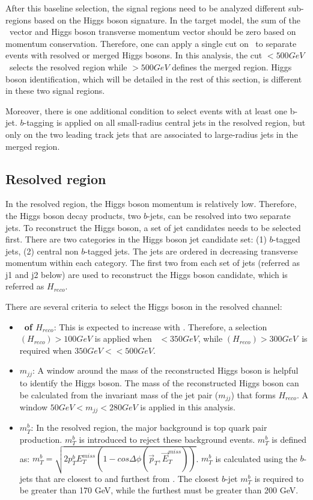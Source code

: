 \par After this baseline selection, the signal regions need to be analyzed different sub-regions based on the Higgs boson signature. In the target model, the sum of the \met~vector and Higgs boson transverse momentum vector should be zero based on momentum conservation. Therefore, one can apply a single cut on \met~to separate events with resolved or merged Higgs bosons. In this analysis, the cut \met$<500GeV$~selects the resolved region while \met$>500GeV$ defines the merged region. Higgs boson identification, which will be detailed in the rest of this section, is different in these two signal regions.
\par Moreover, there is one additional condition to select events with at least one b-jet. $b$-tagging is applied on all small-radius central jets in the resolved region, but only on the two leading track jets that are associated to large-radius jets in the merged region.

\subsection{Resolved region}

\par In the resolved region, the Higgs boson momentum is relatively low. Therefore, the Higgs boson decay products, two $b$-jets, can be resolved into two separate jets. To reconstruct the Higgs boson, a set of jet candidates needs to be selected first. There are two categories in the Higgs boson jet candidate set: (1) $b$-tagged jets, (2) central non $b$-tagged jets. The jets are ordered in decreasing transverse momentum within each category. The first two from each set of jets (referred as j1 and j2 below) are used to reconstruct the Higgs boson candidate, which is referred as $H_{reco}$.

\par There are several criteria to select the Higgs boson in the resolved channel:

\begin{itemize}
    \item \textbf{\pt~of $H_{reco}$}: This is expected to increase with \met. Therefore, a selection \pt$(H_{reco})>100GeV$ is applied when \met~$<350GeV$, while \pt$(H_{reco})>300GeV$~is required when $350GeV<$\met$<500GeV$.
    \item \textbf{$m_{jj}$}: A window around the mass of the reconstructed Higgs boson is helpful to identify the Higgs boson. The mass of the reconstructed Higgs boson can be calculated from the invariant mass of the jet pair ($m_{jj}$) that forms $H_{reco}$. A window $50GeV<m_{jj}<280GeV$ is applied in this analysis. 
    \item \textbf{$m_{T}^{b}$}: In the resolved region, the major background is top quark pair production. $m_{T}^{b}$ is introduced to reject these background events. $m_{T}^{b}$ is defined as: $m_{T}^{b}=\sqrt{2p_{T}^{b}E_{T}^{miss}(1-cos\Delta\phi(\vec{p}_{T}, \vec{E}_{T}^{miss}))}$. $m_{T}^{b}$ is calculated using the $b$-jets that are closest to and furthest from \met. The closest $b$-jet $m_{T}^b$ is required to be greater than 170 GeV, while the furthest must be greater than 200 GeV.
\end{itemize}

